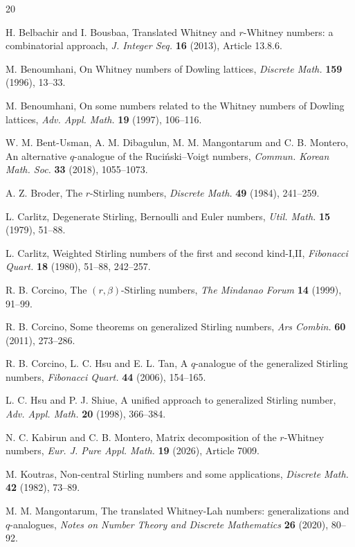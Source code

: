 \documentclass[12pt]{article}
\begin{document}
\begin{thebibliography}{20}
	
	 H. Belbachir and I. Bousbaa, Translated Whitney and $r$-Whitney numbers: a combinatorial approach, \textit{J. Integer Seq.} \textbf{16} (2013), Article 13.8.6.
	
	 M. Benoumhani, On Whitney numbers of Dowling lattices, \textit{Discrete Math.} \textbf{159} (1996), 13--33.
	
	 M. Benoumhani, On some numbers related to the Whitney numbers of Dowling lattices, \textit{Adv. Appl. Math.} \textbf{19} (1997), 106--116.
	
	 W. M. Bent-Usman, A. M. Dibagulun, M. M. Mangontarum and C. B. Montero, An alternative $q$-analogue of the Ruci\'nski--Voigt numbers, \textit{Commun. Korean Math. Soc.} \textbf{33} (2018), 1055--1073.
	
	 A. Z. Broder, The $r$-Stirling numbers, \textit{Discrete Math.} \textbf{49} (1984), 241--259.
	
	 L. Carlitz, Degenerate Stirling, Bernoulli and Euler numbers, \textit{Util. Math.} \textbf{15} (1979), 51--88.
	
	 L. Carlitz, Weighted Stirling numbers of the first and second kind-I,II, \textit{Fibonacci Quart.} \textbf{18} (1980), 51--88, 242--257.
	
	 R. B. Corcino, The $(r,\beta)$-Stirling numbers, \textit{The Mindanao Forum} \textbf{14} (1999), 91--99.
	
	 R. B. Corcino, Some theorems on generalized Stirling numbers, \textit{Ars Combin.} \textbf{60} (2011), 273--286.
	
	 R. B. Corcino, L. C. Hsu and E. L. Tan, A $q$-analogue of the generalized Stirling numbers, \textit{Fibonacci Quart.} \textbf{44} (2006), 154--165.
	
	 L. C. Hsu and P. J. Shiue, A unified approach to generalized Stirling number, \textit{Adv. Appl. Math.} \textbf{20} (1998), 366--384.
	
	 N. C. Kabirun and C. B. Montero, Matrix decomposition of the $r$-Whitney numbers, \textit{Eur. J. Pure Appl. Math.} \textbf{19} (2026), Article 7009.
	
	 M. Koutras, Non-central Stirling numbers and some applications, \textit{Discrete Math.} \textbf{42} (1982), 73--89.
	
	 M. M. Mangontarum, The translated Whitney-Lah numbers: generalizations and $q$-analogues, \textit{Notes on Number Theory and Discrete Mathematics} \textbf{26} (2020), 80--92.
	

\end{thebibliography}
\end{document}
